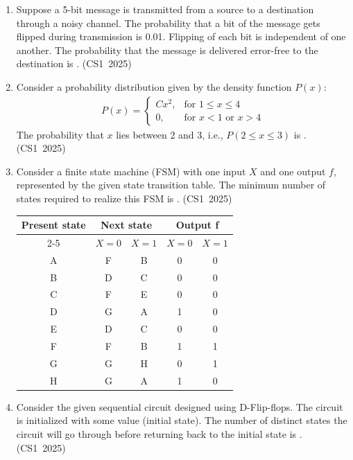 \begin{enumerate}[label=\thesubsection.\arabic*, ref=\thesubsection.\theenumi]
\item Suppose a 5-bit message is transmitted from a source to a destination through a noisy channel. The probability that a bit of the message gets flipped during transmission is 0.01. Flipping of each bit is independent of one another. The probability that the message is delivered error-free to the destination is \underline{\hspace{1cm}}.
\hfill (CS1~2025)

\item Consider a probability distribution given by the density function $P(x)$:
\begin{align*}
P(x) = \begin{cases} C x^2, & \text{for } 1 \le x \le 4 \\ 0, & \text{for } x < 1 \text{ or } x > 4 \end{cases}
\end{align*}
The probability that $x$ lies between 2 and 3, i.e., $P(2 \le x \le 3)$ is \underline{\hspace{1cm}}.
\hfill (CS1~2025)

\item Consider a finite state machine (FSM) with one input $X$ and one output $f$, represented by the given state transition table. The minimum number of states required to realize this FSM is \underline{\hspace{1cm}}.
\hfill (CS1~2025)

\begin{center}
\begin{tabular}{|c|c|c|c|c|}
\hline
\multirow{2}{*}{\textbf{Present state}} & \multicolumn{2}{c|}{\textbf{Next state}} & \multicolumn{2}{c|}{\textbf{Output f}} \\ \cline{2-5}
 & $X=0$ & $X=1$ & $X=0$ & $X=1$ \\ \hline
A & F & B & 0 & 0 \\
B & D & C & 0 & 0 \\
C & F & E & 0 & 0 \\
D & G & A & 1 & 0 \\
E & D & C & 0 & 0 \\
F & F & B & 1 & 1 \\
G & G & H & 0 & 1 \\
H & G & A & 1 & 0 \\ \hline
\end{tabular}
\end{center}

\item Consider the given sequential circuit designed using D-Flip-flops. The circuit is initialized with some value (initial state). The number of distinct states the circuit will go through before returning back to the initial state is \underline{\hspace{1cm}}.
\hfill (CS1~2025)


\end{enumerate}
